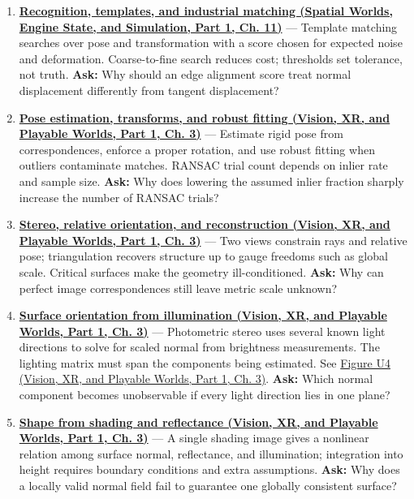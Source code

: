 \begin{enumerate}
\item
  \textbf{\href{../05-Spatial-Worlds-Engine-State-and-Simulation-P01/main.pdf\#04-visual-computing-ii-ch030-recognition-templates-and-industrial-matching}{Recognition, templates, and industrial matching (Spatial Worlds, Engine State, and Simulation, Part 1, Ch. 11)}} --- Template matching searches over pose and transformation with a score chosen for expected noise and deformation. Coarse-to-fine search reduces cost; thresholds set tolerance, not truth. \textbf{Ask:} Why should an edge alignment score treat normal displacement differently from tangent displacement?
\item
  \textbf{\href{../07-Vision-XR-and-Playable-Worlds-P01/main.pdf\#04-visual-computing-ii-ch032-pose-estimation-transforms-and-robust-fitting}{Pose estimation, transforms, and robust fitting (Vision, XR, and Playable Worlds, Part 1, Ch. 3)}} --- Estimate rigid pose from correspondences, enforce a proper rotation, and use robust fitting when outliers contaminate matches. RANSAC trial count depends on inlier rate and sample size. \textbf{Ask:} Why does lowering the assumed inlier fraction sharply increase the number of RANSAC trials?
\item
  \textbf{\href{../07-Vision-XR-and-Playable-Worlds-P01/main.pdf\#04-visual-computing-ii-ch032-stereo-relative-orientation-and-reconstruction}{Stereo, relative orientation, and reconstruction (Vision, XR, and Playable Worlds, Part 1, Ch. 3)}} --- Two views constrain rays and relative pose; triangulation recovers structure up to gauge freedoms such as global scale. Critical surfaces make the geometry ill-conditioned. \textbf{Ask:} Why can perfect image correspondences still leave metric scale unknown?
\item
  \textbf{\href{../07-Vision-XR-and-Playable-Worlds-P01/main.pdf\#04-visual-computing-ii-ch032-surface-orientation-from-illumination}{Surface orientation from illumination (Vision, XR, and Playable Worlds, Part 1, Ch. 3)}} --- Photometric stereo uses several known light directions to solve for scaled normal from brightness measurements. The lighting matrix must span the components being estimated. See \href{../07-Vision-XR-and-Playable-Worlds-P01/main.pdf\#04-visual-computing-ii-ch032-figure-u4---lighting-rank-determines-which-normal-components-can-be-measured}{Figure U4 (Vision, XR, and Playable Worlds, Part 1, Ch. 3)}. \textbf{Ask:} Which normal component becomes unobservable if every light direction lies in one plane?
\item
  \textbf{\href{../07-Vision-XR-and-Playable-Worlds-P01/main.pdf\#04-visual-computing-ii-ch032-shape-from-shading-and-reflectance}{Shape from shading and reflectance (Vision, XR, and Playable Worlds, Part 1, Ch. 3)}} --- A single shading image gives a nonlinear relation among surface normal, reflectance, and illumination; integration into height requires boundary conditions and extra assumptions. \textbf{Ask:} Why does a locally valid normal field fail to guarantee one globally consistent surface?

\end{enumerate}

